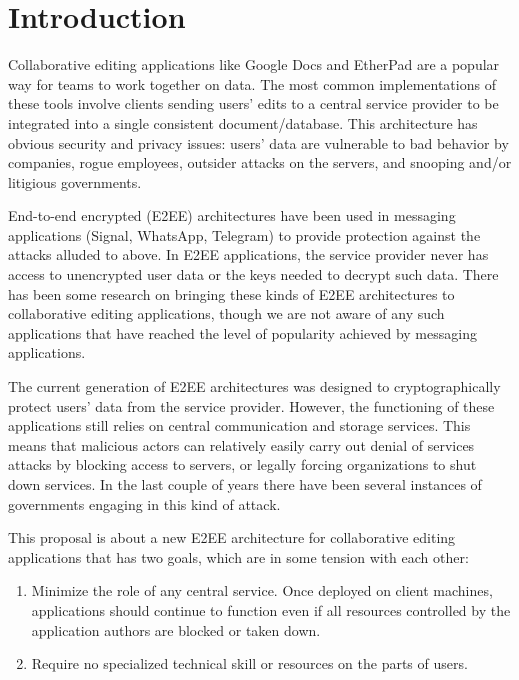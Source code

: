 \documentclass{sig-alternate-hotpets}
\begin{document}
\maketitle

\section{Introduction}
Collaborative editing applications like Google Docs and EtherPad are a popular way for teams to work together on data.
The most common implementations of these tools involve clients sending users' edits to a central service provider to be integrated into a single consistent document/database.
This architecture has obvious security and privacy issues: users' data are vulnerable to bad behavior by companies, rogue employees, outsider attacks on the servers, and snooping and/or litigious governments.

End-to-end encrypted (E2EE) architectures have been used in messaging applications (Signal, WhatsApp, Telegram) to provide protection against the attacks alluded to above.
In E2EE applications, the service provider never has access to unencrypted user data or the keys needed to decrypt such data.
There has been some research on bringing these kinds of E2EE architectures to collaborative editing applications, though we are not aware of any such applications that have reached the level of popularity achieved by messaging applications.

The current generation of E2EE architectures was designed to cryptographically protect users' data from the service provider.
However, the functioning of these applications still relies on central communication and storage services.
This means that malicious actors can relatively easily carry out denial of services attacks by blocking access to servers, or legally forcing organizations to shut down services.
In the last couple of years there have been several instances of governments engaging in this kind of attack.

This proposal is about a new E2EE architecture for collaborative editing applications that has two goals, which are in some tension with each other:

\begin{enumerate}
\item Minimize the role of any central service.
  Once deployed on client machines, applications should continue to function even if all resources controlled by the application authors are blocked or taken down.
\item Require no specialized technical skill or resources on the parts of users.
\end{enumerate}
\end{document}
